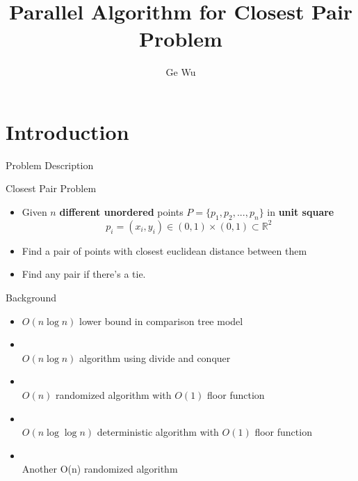 \documentclass[18pt]{beamer}
\title[Parallel Algorithm for Closest Pair Problem]{Parallel Algorithm for Closest Pair Problem}
\subtitle{}
\author{Ge Wu}
\institute{Institute for Theoretical Informatics}
\def \loose {15pt}
\begin{document}

\begin{frame}
\titlepage
\end{frame}


\section{Introduction}

\begin{frame}{Problem Description}
\begin{block}{Closest Pair Problem}
\begin{itemize}
\item Given $n$ \textbf{different unordered} points $P = \{p_1,p_2, ... ,p_n\}$ in \textbf{unit square} \\
$$p_i = (x_i, y_i) \in (0, 1) \times (0,1) \subset \mathbb{R}^2$$
\item Find a pair of points with closest euclidean distance between them
\item Find any pair if there's a tie.
\end{itemize}
\end{block}
\end{frame}

\begin{frame}{Background}
\begin{itemize}
	\setlength{\itemsep}{\loose}
	\item $O(n \log n)$ lower bound in comparison tree model
	\item \textbf{\cite{Bentley:1976:DMS:800113.803652}} \\
		$O(n\log n)$ algorithm using divide and conquer
	\item \textbf{\cite{major}}\\ \alert{$O(n)$ randomized algorithm with $O(1)$ floor function}
 	\item \textbf{\cite{fortune1978note}} \\ $O(n \log \log n)$ deterministic algorithm with $O(1)$ floor function
 	\item \textbf{\cite{khuller1995simple}} \\ Another O(n) randomized algorithm
\end{itemize}
\end{frame}
\end{document}
